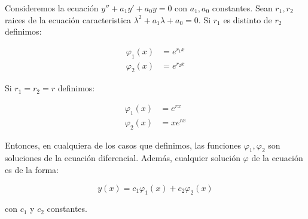 		\begin{teorema}
			Consideremos la ecuación $y'' + a_1 y' + a_0 y = 0$ con $a_1, a_0$ constantes.
			Sean $r_1, r_2$ raices de la ecuación caracteristica $\lambda^2 + a_1 \lambda + a_0 = 0$.
			Si $r_1$ es distinto de $r_2$ definimos:

			\begin{align*}
				\varphi_1(x) &= e^{r_1 x} \\
				\varphi_2(x) &= e^{r_2 x}
			\end{align*}

			Si $r_1 = r_2 = r$ definimos:

			\begin{align*}
				\varphi_1(x) &= e^{rx} \\
				\varphi_2(x) &= x e^{rx}
			\end{align*}

			Entonces, en cualquiera de los casos que definimos, las funciones $\varphi_1, \varphi_2$ son soluciones de la ecuación diferencial.
			Además, cualquier solución $\varphi$ de la ecuación es de la forma:

			\begin{equation}
				y(x) = c_1 \varphi_1(x) + c_2 \varphi_2(x)
			\end{equation}

			con $c_1$ y $c_2$ constantes.
		\end{teorema}

